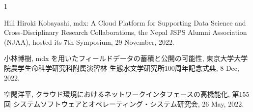 \begin{招待講演}{1}

Hill Hiroki Kobayashi, mdx: A Cloud Platform for Supporting Data Science and Cross-Disciplinary Research Collaborations, the Nepal JSPS Alumni Association (NJAA), hosted its 7th Symposium, 29 November, 2022.

小林博樹, mdx を用いたフィールドデータの蓄積と公開の可能性, 東京大学大学院農学生命科学研究科附属演習林 生態水文学研究所100周年記念式典, 8 Dec, 2022.

空閑洋平, クラウド環境におけるネットワークインタフェースの高機能化, 第155回 システムソフトウェアとオペレーティング・システム研究会, 26 May, 2022.



\end{招待講演}

